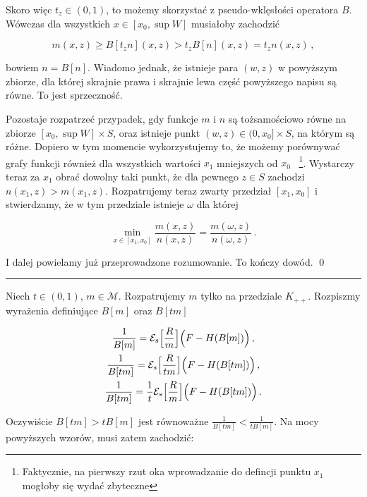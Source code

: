Skoro więc $t_{z} \in (0,1)$, to możemy skorzystać z pseudo-wklęsłości operatora $B$. Wówczas dla wszystkich $x \in [x_0, \sup W]$ musiałoby zachodzić

\begin{equation*}
	m (x,z) \geq B[t_{z} n](x,z) > t_{z} B[n](x,z) = t_{z} n(x,z) \,,
\end{equation*}   	

bowiem $n = B[n]$. Wiadomo jednak, że istnieje para $(w,z)$ w powyższym zbiorze, dla której skrajnie prawa i skrajnie lewa część powyższego napisu są równe. To jest sprzeczność.

Pozostaje rozpatrzeć przypadek, gdy funkcje $m$ i $n$ są tożsamościowo równe na zbiorze $[x_0, \sup W] \times S$, oraz istnieje punkt $(w,z) \in (0, x_0] \times S$, na którym są różne. Dopiero w tym momencie wykorzystujemy to, że możemy porównywać grafy funkcji również dla wszystkich wartości $x_1$ mniejszych od $x_0$ ~\footnote{Faktycznie, na pierwszy rzut oka wprowadzanie do defincji punktu $x_1$ mogłoby się wydać zbyteczne}. Wystarczy teraz za $x_1$ obrać dowolny taki punkt, że dla pewnego $z \in S$ zachodzi $n(x_1,z) > m(x_1,z)$. Rozpatrujemy teraz zwarty przedział $[x_1, x_0]$ i stwierdzamy, że w tym przedziale istnieje $\omega$ dla której 

$$\underset{x \in [x_1, x_0]}{\min} \frac{m(x,z)}{n(x,z)} = \frac{m(\omega,z)}{n(\omega,z)} \,.$$

I dalej powielamy już przeprowadzone rozumowanie. To kończy dowód.
\qed
\newline


\hrule
\begin{dowod}\label{proof_quasi_concavity}
\end{dowod}


	Niech $t \in (0,1)$, $m \in \mathcal{M}$. Rozpatrujemy $m$ tylko na przedziale $K_{++}$. Rozpiszmy wyrażenia definiujące $B[m]$ oraz $B[tm]$
	
\begin{gather*}
	\frac{1}{B[m]} 	= \mathcal{E}_s \Bigl[ \frac{R}{m}\Bigl]	\Bigl( F - H(B[m])\Bigl) \,,\cr
	\frac{1}{B[tm]} = \mathcal{E}_s \Bigl[ \frac{R}{tm}\Bigl]	\Bigl( F - H(B[tm])\Bigl) \,,\cr 
	\frac{1}{B[tm]} =  \frac{1}{t}\mathcal{E}_s \Bigl[ \frac{R}{m}\Bigl]	\Bigl( F - H(B[tm])\Bigl)\,. \cr 
\end{gather*}	

	Oczywiście $B[tm] > tB[m]$ jest równoważne $\frac{1}{B[tm]}< \frac{1}{tB[m]}$. Na mocy powyższych wzorów, musi zatem zachodzić:
	
